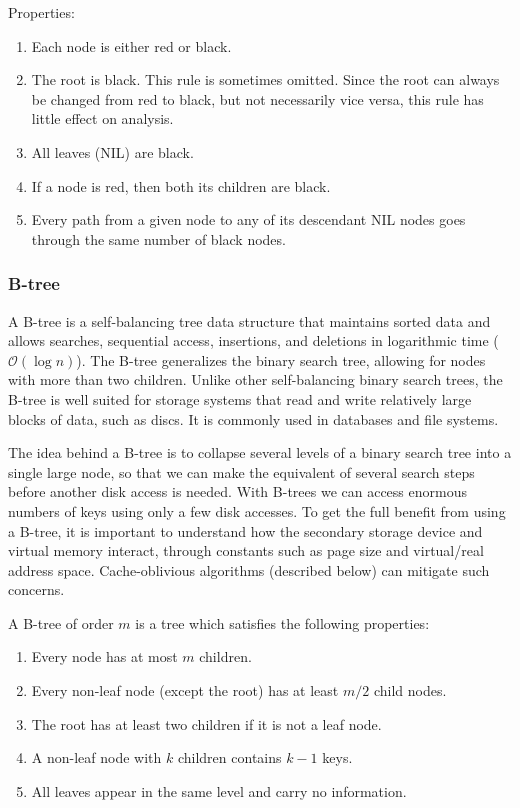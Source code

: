 \documentclass{article}
\newcommand{\bigO}{\ensuremath{\mathcal{O}}}
\begin{document}
    Properties:
    \begin{enumerate}
        \item Each node is either red or black.
        \item The root is black. This rule is sometimes omitted. Since the root can always be changed from red to black, but not necessarily vice versa, this rule has little effect on analysis.
        \item All leaves (NIL) are black.
        \item If a node is red, then both its children are black.
        \item Every path from a given node to any of its descendant NIL nodes goes through the same number of black nodes.
    \end{enumerate}
    
    \subsubsection{B-tree}
    A B-tree is a self-balancing tree data structure that maintains sorted data and allows searches, sequential access, insertions, and deletions in logarithmic time ($\bigO(\log n)$). The B-tree generalizes the binary search tree, allowing for nodes with more than two children. Unlike other self-balancing binary search trees, the B-tree is well suited for storage systems that read and write relatively large blocks of data, such as discs. It is commonly used in databases and file systems.
    
    The idea behind a B-tree is to collapse several levels of a binary search tree into a single large node, so that we can make the equivalent of several search steps before another disk access is needed. With B-trees we can access enormous numbers of keys using only a few disk accesses. To get the full benefit from using a B-tree, it is important to understand how the secondary storage device and virtual memory interact, through constants such as page size and virtual/real address space. Cache-oblivious algorithms (described below) can mitigate such concerns.
    
    A B-tree of order $m$ is a tree which satisfies the following properties:
    \begin{enumerate}
        \item Every node has at most $m$ children.
        \item Every non-leaf node (except the root) has at least $m/2$ child nodes.
        \item The root has at least two children if it is not a leaf node.
        \item A non-leaf node with $k$ children contains $k-1$ keys.
        \item All leaves appear in the same level and carry no information.
    \end{enumerate}
    
\end{document}
